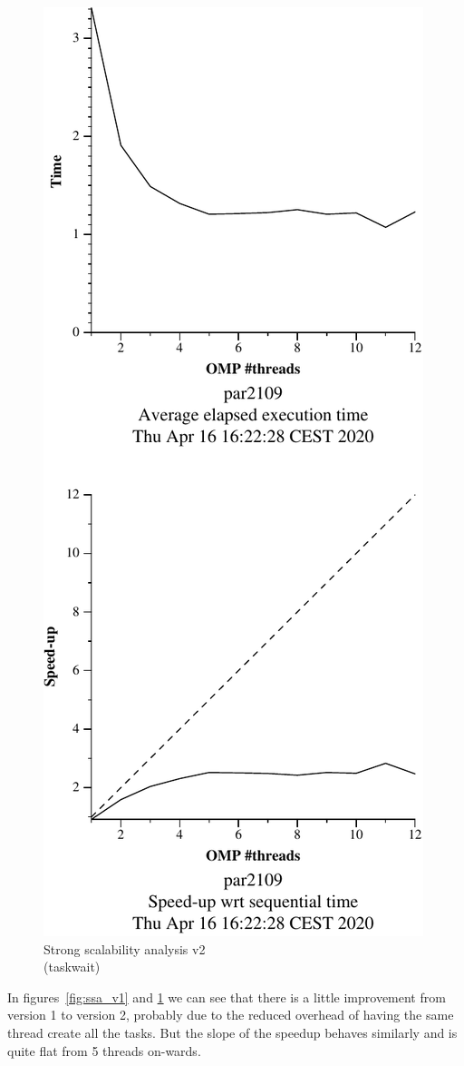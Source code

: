 \begin{figure}[H]
\begin{minipage}{0.5\textwidth}
        \label{fig:ssa_v1} 
    \end{minipage}
    \begin{minipage}{0.5\textwidth}
        \centering
        \includegraphics[width=0.7\linewidth]{plots/v2-crop.pdf}
        \caption{Strong scalability analysis v2 \\ (taskwait)}
        \label{fig:ssa_v2} 
    \end{minipage}
\end{figure}

In figures~\ref{fig:ssa_v1} and \ref{fig:ssa_v2} we can see that there is a little improvement
from version 1 to version 2, probably due to the reduced overhead of having the same thread create all the
tasks. But the slope of the speedup behaves similarly and is quite flat from 5 threads on-wards.

